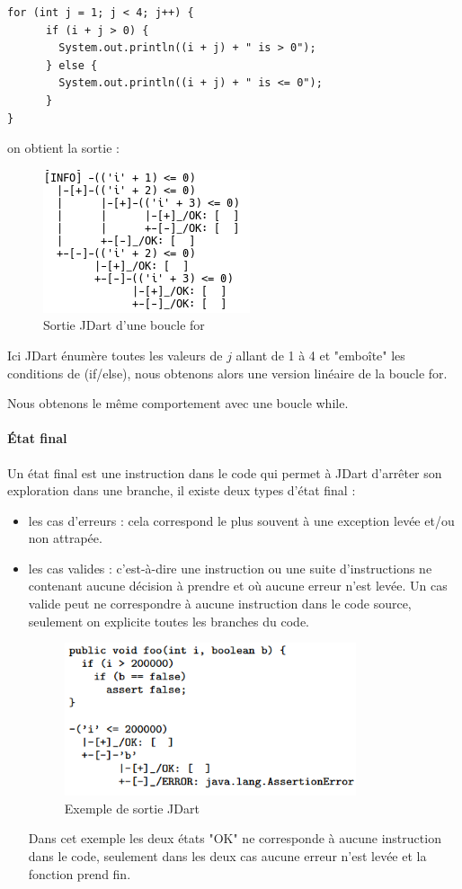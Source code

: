 \begin{verbatim}
for (int j = 1; j < 4; j++) {
      if (i + j > 0) {
      	System.out.println((i + j) + " is > 0");
      } else {
      	System.out.println((i + j) + " is <= 0");
      }
}
\end{verbatim}
on obtient la sortie :
\begin{figure}[H]
 \centering
 \includegraphics[]{./images/jdart_loops.png}
 \caption{Sortie JDart d'une boucle for}
\end{figure}

Ici JDart énumère toutes les valeurs de $j$ allant de 1 à 4 et "embo\^ite" les 
conditions de (if/else), nous obtenons alors une version linéaire de la boucle 
for.

Nous obtenons le même comportement avec une boucle while.

\paragraph{État final}
Un état final est une instruction dans le code qui permet à JDart d'arrêter son 
exploration dans une branche, il existe deux types d'état final : 
\begin{itemize}
 \item les cas d'erreurs : cela correspond le plus souvent à une exception 
levée et/ou non attrapée.
 \item les cas valides : c'est-à-dire une instruction ou une suite 
d'instructions ne contenant aucune décision à prendre et où aucune erreur n'est 
levée. Un cas valide peut ne correspondre à aucune instruction dans le code 
source, seulement on explicite toutes les branches du code.

\begin{figure}[H]
	\centering	
	\includegraphics[scale=0.5]{images/jdart_exemple.png}
	\caption{Exemple de sortie JDart}
	\label{fig:exemple_out_jdart}
\end{figure}

Dans cet exemple les deux états "OK" ne corresponde à aucune instruction dans 
le code, seulement dans les deux cas aucune erreur n'est levée et la fonction 
prend fin.

\end{itemize}

